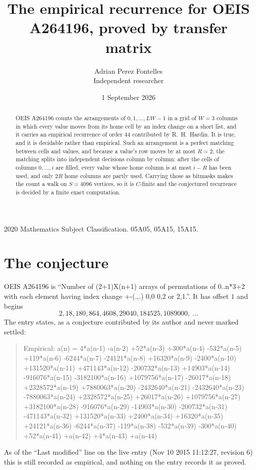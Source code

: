 \documentclass[11pt,a4paper]{article}
\title{The empirical recurrence for OEIS A264196, proved by transfer matrix}
\author{Adrian Perez Fontelles\\ \small Independent researcher}
\date{1 September 2026}
\theoremstyle{plain}
\theoremstyle{definition}
\begin{document}
\maketitle

\begin{abstract}
OEIS A264196 counts the arrangements of $0,1,\dots,LW-1$ in a grid of $W=3$ columns in which
every value moves from its home cell by an index change on a short list, and it carries an
empirical recurrence of order $44$ contributed by R.~H.~Hardin. It is true, and it is
decidable rather than empirical. Such an arrangement is a perfect matching between cells and
values, and because a value's row moves by at most $R=2$, the matching splits into
independent decisions column by column: after the cells of columns $0,\dots,i$ are filled,
every value whose home column is at most $i-R$ has been used, and only $2R$ home columns are
partly used. Carrying those as bitmasks makes the count a walk on $S=4096$ vertices, so it is
$C$-finite and the conjectured recurrence is decided by a finite exact computation.
\end{abstract}

\noindent\small 2020 Mathematics Subject Classification. 05A05, 05A15, 15A15.\normalsize

\section{The conjecture}

OEIS A264196 is ``Number of (2+1)X(n+1) arrays of permutations of 0..n*3+2 with each element having index change +-(.,.) 0,0 0,2 or 2,1.''. It has offset $1$ and begins
\[
2, 18, 180, 864, 4608, 29040, 184525, 1089000,\ \dots
\]
The entry states, as a conjecture contributed by its author and never marked settled:
\begin{quote}
Empirical: a(n) = 4*a(n-1) -a(n-2) +52*a(n-3) +300*a(n-4) -532*a(n-5) +119*a(n-6) -6244*a(n-7) -24121*a(n-8) +16320*a(n-9) -2400*a(n-10) +131520*a(n-11) +471143*a(n-12) -200732*a(n-13) +14903*a(n-14) -916076*a(n-15) -3182100*a(n-16) +1079756*a(n-17) -26017*a(n-18) +2328572*a(n-19) +7880063*a(n-20) -2432640*a(n-21) -2432640*a(n-23) -7880063*a(n-24) +2328572*a(n-25) +26017*a(n-26) +1079756*a(n-27) +3182100*a(n-28) -916076*a(n-29) -14903*a(n-30) -200732*a(n-31) -471143*a(n-32) +131520*a(n-33) +2400*a(n-34) +16320*a(n-35) +24121*a(n-36) -6244*a(n-37) -119*a(n-38) -532*a(n-39) -300*a(n-40) +52*a(n-41) +a(n-42) +4*a(n-43) +a(n-44)
\end{quote}
As of the ``Last modified'' line on the live entry (Nov 10 2015 11:12:27, revision 6) this is still
recorded as empirical, and nothing on the entry records it as proved.
\end{document}
